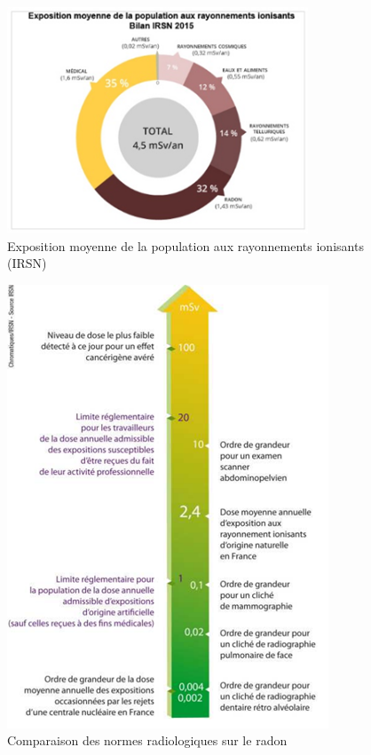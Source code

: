 \documentclass{article}
\begin{document}
\begin{figure}[H]
    \centering
    \includegraphics[width=0.8\textwidth]{II_A2_4.png}
    \caption{Exposition moyenne de la population aux rayonnements ionisants (IRSN)}
    \label{fig:exposition_moyenne}
\end{figure}

\begin{figure}[H]
    \centering
    \includegraphics[width=\textwidth]{II_A2_5.png}
    \caption{Comparaison des normes radiologiques sur le radon}
    \label{fig:comparaison_normes}
\end{figure}
\end{document}

